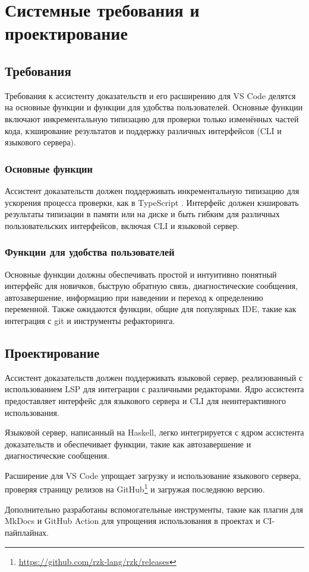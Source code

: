 \chapter{Системные требования и проектирование}
\label{chap:req}

\section{Требования}

Требования к ассистенту доказательств \Rzk{} и его расширению для VS Code делятся на основные функции и функции для удобства пользователей. Основные функции включают инкрементальную типизацию для проверки только изменённых частей кода, кэширование результатов и поддержку различных интерфейсов (CLI и языкового сервера).

\subsection{Основные функции}

Ассистент доказательств \Rzk{} должен поддерживать инкрементальную типизацию для ускорения процесса проверки, как в TypeScript \cite{Vanderkam2024}. Интерфейс должен кэшировать результаты типизации в памяти или на диске и быть гибким для различных пользовательских интерфейсов, включая CLI и языковой сервер.

\subsection{Функции для удобства пользователей}

Основные функции должны обеспечивать простой и интуитивно понятный интерфейс для новичков, быструю обратную связь, диагностические сообщения, автозавершение, информацию при наведении и переход к определению переменной. Также ожидаются функции, общие для популярных IDE, такие как интеграция с git и инструменты рефакторинга.

\section{Проектирование}

Ассистент доказательств должен поддерживать языковой сервер, реализованный с использованием LSP для интеграции с различными редакторами. Ядро ассистента предоставляет интерфейс для языкового сервера и CLI для неинтерактивного использования.

Языковой сервер, написанный на Haskell, легко интегрируется с ядром ассистента доказательств и обеспечивает функции, такие как автозавершение и диагностические сообщения.

Расширение для VS Code упрощает загрузку и использование языкового сервера, проверяя страницу релизов на GitHub\footnote{\url{https://github.com/rzk-lang/rzk/releases}} и загружая последнюю версию.

Дополнительно разработаны вспомогательные инструменты, такие как плагин для MkDocs и GitHub Action для упрощения использования \Rzk{} в проектах и CI-пайплайнах.

